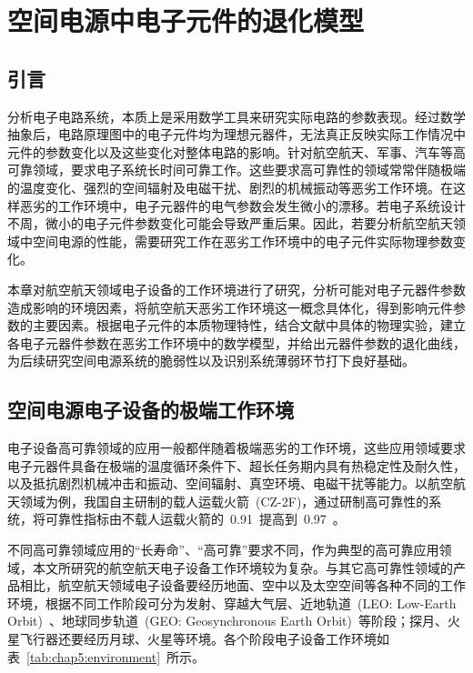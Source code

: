 \chapter{空间电源中电子元件的退化模型}
\label{cha:circ_parameter}

\section{引言}
\label{sec:chap2:int}
分析电子电路系统，本质上是采用数学工具来研究实际电路的参数表现。经过数学抽象后，电路原理图中的电子元件均为理想元器件，无法真正反映实际工作情况中元件的参数变化以及这些变化对整体电路的影响。针对航空航天、军事、汽车等高可靠领域，要求电子系统长时间可靠工作。这些要求高可靠性的领域常常伴随极端的温度变化、强烈的空间辐射及电磁干扰、剧烈的机械振动等恶劣工作环境。在这样恶劣的工作环境中，电子元器件的电气参数会发生微小的漂移。若电子系统设计不周，微小的电子元件参数变化可能会导致严重后果。因此，若要分析航空航天领域中空间电源的性能，需要研究工作在恶劣工作环境中的电子元件实际物理参数变化。

本章对航空航天领域电子设备的工作环境进行了研究，分析可能对电子元器件参数造成影响的环境因素，将航空航天恶劣工作环境这一概念具体化，得到影响元件参数的主要因素。根据电子元件的本质物理特性，结合文献中具体的物理实验，建立各电子元器件参数在恶劣工作环境中的数学模型，并给出元器件参数的退化曲线，为后续研究空间电源系统的脆弱性以及识别系统薄弱环节打下良好基础。

\section{空间电源电子设备的极端工作环境}
\label{sec:chap2:environment}
电子设备高可靠领域的应用一般都伴随着极端恶劣的工作环境，这些应用领域要求电子元器件具备在极端的温度循环条件下、超长任务期内具有热稳定性及耐久性，以及抵抗剧烈机械冲击和振动、空间辐射、真空环境、电磁干扰等能力\cite{Chen2007ReliabilityEnviron}。以航空航天领域为例，我国自主研制的载人运载火箭~(CZ-2F)，通过研制高可靠性的系统，将可靠性指标由不载人运载火箭的~0.91~提高到~0.97~\cite{GU2004CZ}。

不同高可靠领域应用的“长寿命”、“高可靠”要求不同，作为典型的高可靠应用领域，本文所研究的航空航天电子设备工作环境较为复杂。与其它高可靠性领域的产品相比，航空航天领域电子设备要经历地面、空中以及太空空间等各种不同的工作环境，根据不同工作阶段可分为发射、穿越大气层、近地轨道~(LEO: Low-Earth Orbit)~、地球同步轨道~(GEO: Geosynchronous Earth Orbit)~等阶段；探月、火星飞行器还要经历月球、火星等环境。各个阶段电子设备工作环境如表~\ref{tab:chap5:environment}~所示。

